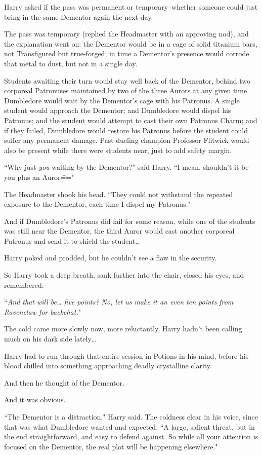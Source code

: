 Harry asked if the pass was permanent or temporary\---whether someone could just bring in the same Dementor again the next day.

The pass was temporary (replied the Headmaster with an approving nod), and the explanation went on: the Dementor would be in a cage of solid titanium bars, not Transfigured but true-forged; in time a Dementor's presence would corrode that metal to dust, but not in a single day.

Students awaiting their turn would stay well back of the Dementor, behind two corporeal Patronuses maintained by two of the three Aurors at any given time. Dumbledore would wait by the Dementor's cage with his Patronus. A single student would approach the Dementor; and Dumbledore would dispel his Patronus; and the student would attempt to cast their own Patronus Charm; and if they failed, Dumbledore would restore his Patronus before the student could suffer any permanent damage. Past dueling champion Professor Flitwick would also be present while there were students near, just to add safety margin.

``Why just \emph{you} waiting by the Dementor?" said Harry. ``I mean, shouldn't it be you plus an Auror\==="

The Headmaster shook his head. ``They could not withstand the repeated exposure to the Dementor, each time I dispel my Patronus."

And if Dumbledore's Patronus did fail for some reason, while one of the students was still near the Dementor, the third Auror would cast another corporeal Patronus and send it to shield the student{\ldots}

Harry poked and prodded, but he couldn't see a flaw in the security.

So Harry took a deep breath, sank further into the chair, closed his eyes, and remembered:

``\emph{And that will be{\ldots} five points? No, let us make it an even ten points from Ravenclaw for backchat.}"

The cold came more slowly now, more reluctantly, Harry hadn't been calling much on his dark side lately{\ldots}

Harry had to run through that entire session in Potions in his mind, before his blood chilled into something approaching deadly crystalline clarity.

And then he thought of the Dementor.

And it was obvious.

``The Dementor is a distraction," Harry said. The coldness clear in his voice, since that was what Dumbledore wanted and expected. ``A large, salient threat, but in the end straightforward, and easy to defend against. So while all your attention is focused on the Dementor, the real plot will be happening elsewhere."

